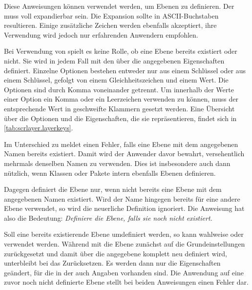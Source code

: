 \begin{Declaration}
\end{Declaration}
Diese Anweisungen können verwendet werden, um Ebenen zu definieren. Der
 muss voll expandierbar sein. Die Expansion sollte in
ASCII-Buchstaben resultieren. Einige zusätzliche Zeichen werden ebenfalls
akzeptiert, ihre Verwendung wird jedoch nur erfahrenden Anwendern empfohlen.

Bei Verwendung von  spielt
es keine Rolle, ob eine Ebene  bereits existiert oder
nicht. Sie wird in jedem Fall mit den über die 
angegebenen Eigenschaften definiert. Einzelne Optionen bestehen entweder nur
aus einem Schlüssel oder aus einem Schlüssel, gefolgt von einem
Gleichheitszeichen und einem Wert. Die Optionen sind durch Komma voneinander
getrennt. Um innerhalb der Werte einer Option ein Komma oder ein Leerzeichen
verwenden zu können, muss der entsprechende Wert in geschweifte Klammern
gesetzt werden.  Eine Übersicht über die Optionen und die Eigenschaften, die
sie repräsentieren, findet sich in \autoref{tab:scrlayer.layerkeys}.

Im Unterschied zu  meldet
 einen Fehler, falls
eine Ebene mit dem angegebenen Namen bereits existiert. Damit wird der
Anwender davor bewahrt, versehentlich mehrmals denselben Namen zu
verwenden. Dies ist insbesondere auch dann nützlich, wenn Klassen oder Pakete
intern ebenfalls Ebenen definieren.

Dagegen definiert  die
Ebene nur, wenn nicht bereits eine Ebene mit dem angegebenen Namen
existiert. Wird der Name hingegen bereits für eine andere Ebene verwendet, so
wird die neuerliche Definition ignoriert. Die Anweisung hat also die
Bedeutung: \emph{Definiere die Ebene, falls sie noch nicht existiert.}

Soll eine bereits existierende Ebene umdefiniert werden, so kann wahlweise
 oder  verwendet werden. Während mit
 die Ebene zunächst
auf die Grundeinstellungen zurückgesetzt und damit über die angegebene
 komplett neu definiert wird, unterbleibt bei
 das Zurücksetzen. Es werden
dann nur die Eigenschaften geändert, für die in der  auch
Angaben vorhanden sind. Die Anwendung auf eine zuvor noch nicht definierte
Ebene stellt bei beiden Anweisungen einen Fehler dar.

